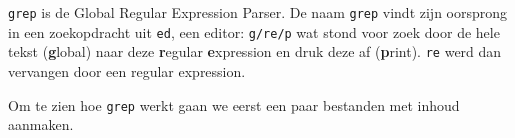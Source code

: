 
\texttt{grep} is de Global Regular Expression Parser. De naam \texttt{grep} vindt zijn oorsprong in een zoekopdracht uit \texttt{ed}, een editor: \texttt{g/re/p} wat stond voor zoek door de hele tekst (\textbf{g}lobal) naar deze \textbf{r}egular \textbf{e}xpression en druk deze af (\textbf{p}rint). \texttt{re} werd dan vervangen door een regular expression.

Om te zien hoe \texttt{grep} werkt gaan we eerst een paar bestanden met inhoud aanmaken.


